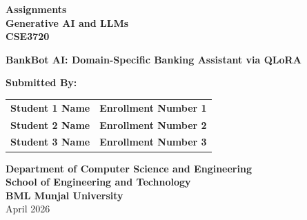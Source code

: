 \documentclass[12pt,a4paper]{article}
\begin{document}
\begin{titlepage}
    \centering
    \vspace*{1cm}
    
    {\Large \textbf{Assignments}} \\
    \vspace{0.5cm}
    {\Large \textbf{Generative AI and LLMs}} \\
    \vspace{0.5cm}
    {\LARGE \textbf{CSE3720}} \\
    
    \vfill
    
    {\Huge \textbf{BankBot AI: Domain-Specific Banking Assistant via QLoRA}} \\
    \vspace{1.5cm}
    
    {\large \textbf{Submitted By:}} \\
    \vspace{0.5cm}
    \begin{tabular}{ll}
        \textbf{Student 1 Name} & \textbf{Enrollment Number 1} \\
        \textbf{Student 2 Name} & \textbf{Enrollment Number 2} \\
        \textbf{Student 3 Name} & \textbf{Enrollment Number 3} \\
    \end{tabular}
    
    \vfill
    
    {\large \textbf{Department of Computer Science and Engineering}} \\
    {\large \textbf{School of Engineering and Technology}} \\
    {\large \textbf{BML Munjal University}} \\
    \vspace{0.8cm}
    {\large April 2026}
\end{titlepage}

\newpage
{}

\begin{abstract}
This report details the implementation of \textbf{BankBot AI}, a domain-specific conversational agent tailored for the banking sector. Built upon the Google Gemma-2B instruction-tuned base model, the system utilizes Quantized Low-Rank Adaptation (QLoRA) to achieve efficient domain adaptation on consumer-grade hardware with limited VRAM (4GB). By fine-tuning on a curated dataset of 2,500 banking queries covering UPI failures, fraud reporting, and account management, we demonstrate a significant improvement in procedural accuracy (from 45\% to 93\%) and intent recognition. The resulting system provides a secure, professional, and context-aware interface that outperforms general-purpose models in handling high-stakes financial interactions.
\end{abstract}
\end{document}
